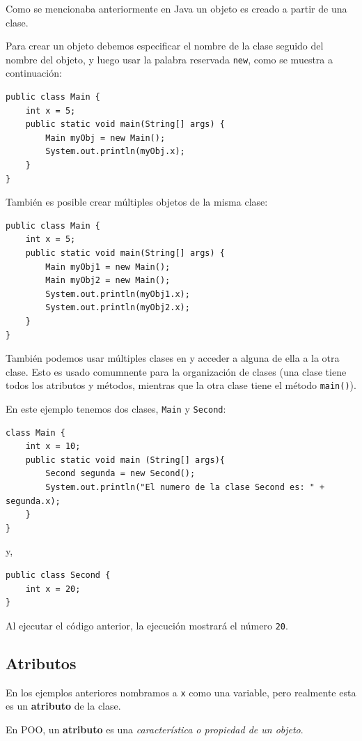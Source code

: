 \documentclass[12pt]{article}
\theoremstyle{largebreak}
\begin{document}
    Como se mencionaba anteriormente en Java un objeto es creado a partir de una clase.

    \begin{obs}
        Para crear un objeto debemos especificar el nombre de la clase seguido del nombre del objeto, y luego usar la palabra reservada \lstinline|new|, como se muestra a continuación:
        \begin{lstlisting}[caption={Declaración de Objeto en Java.},label=DescriptiveLabel]
public class Main {
    int x = 5;
    public static void main(String[] args) {
        Main myObj = new Main();
        System.out.println(myObj.x);
    }
}
        \end{lstlisting}
    \end{obs}

    También es posible crear múltiples objetos de la misma clase:

    \begin{lstlisting}[caption={Declaración de Objeto en Java.},label=DescriptiveLabel]
public class Main {
    int x = 5;
    public static void main(String[] args) {
        Main myObj1 = new Main();
        Main myObj2 = new Main();
        System.out.println(myObj1.x);
        System.out.println(myObj2.x);
    }
}
    \end{lstlisting}

    También podemos usar múltiples clases en y acceder a alguna de ella a la otra clase. Esto es usado comumnente para la organización de clases (una clase tiene todos los atributos y métodos, mientras que la otra clase tiene el método \lstinline|main()|).

    \begin{exa}
        En este ejemplo tenemos dos clases, \lstinline|Main| y \lstinline|Second|:
        \begin{lstlisting}[caption={Archivo con la Clase \lstinline|Main|.},label=DescriptiveLabel]
class Main {
    int x = 10;
    public static void main (String[] args){
        Second segunda = new Second();
        System.out.println("El numero de la clase Second es: " + segunda.x);
    }   
}
        \end{lstlisting}
        y,
        \begin{lstlisting}[caption={Archivo con la Clase \lstinline|Second|.},label=DescriptiveLabel]
public class Second {
    int x = 20;
}
        \end{lstlisting}
        Al ejecutar el código anterior, la ejecución mostrará el número \lstinline|20|.
    \end{exa}

    \subsection{Atributos}

    En los ejemplos anteriores nombramos a \lstinline|x| como una variable, pero realmente esta es un \textbf{atributo} de la clase. 

    \begin{mydef}
        En POO, un \textbf{atributo} es una \textit{característica o propiedad de un objeto}.
    \end{mydef}

    
\end{document}
